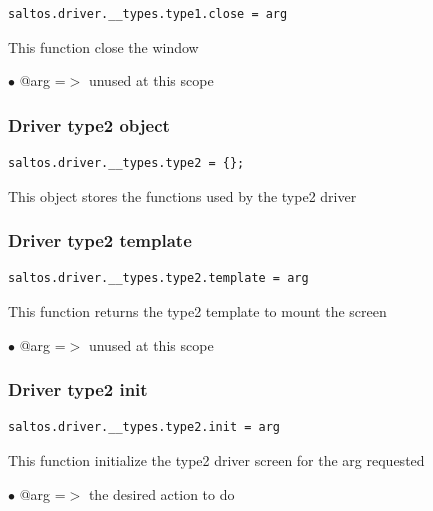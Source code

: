 \documentclass[a4paper]{article}
\begin{document}
\begin{lstlisting}
saltos.driver.__types.type1.close = arg
\end{lstlisting}

This function close the window

\begin{compactitem}
\item[\color{myblue}$\bullet$] @arg =$>$ unused at this scope
\end{compactitem}

\hypertarget{toc187}{}
\subsubsection{Driver type2 object}

\begin{lstlisting}
saltos.driver.__types.type2 = {};
\end{lstlisting}

This object stores the functions used by the type2 driver

\hypertarget{toc188}{}
\subsubsection{Driver type2 template}

\begin{lstlisting}
saltos.driver.__types.type2.template = arg
\end{lstlisting}

This function returns the type2 template to mount the screen

\begin{compactitem}
\item[\color{myblue}$\bullet$] @arg =$>$ unused at this scope
\end{compactitem}

\hypertarget{toc189}{}
\subsubsection{Driver type2 init}

\begin{lstlisting}
saltos.driver.__types.type2.init = arg
\end{lstlisting}

This function initialize the type2 driver screen for the arg requested

\begin{compactitem}
\item[\color{myblue}$\bullet$] @arg =$>$ the desired action to do
\end{compactitem}
\end{document}

